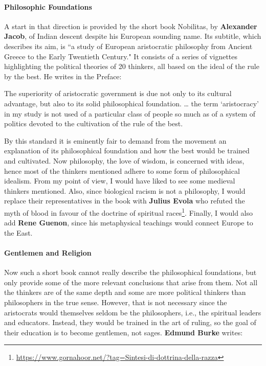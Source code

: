 \paragraph{Philosophic Foundations}
A start in that direction is provided by the short book Nobilitas, by \textbf{Alexander Jacob}, of Indian descent despite his European sounding name. Its subtitle, which describes its aim, is ``a study of European aristocratic philosophy from Ancient Greece to the Early Twentieth Century." It consists of a series of vignettes highlighting the political theories of 20 thinkers, all based on the ideal of the rule by the best. He writes in the Preface:

\begin{quotex}
The superiority of aristocratic government is due not only to its cultural advantage, but also to its solid philosophical foundation. … the term `aristocracy' in my study is not used of a particular class of people so much as of a system of politics devoted to the cultivation of the rule of the best. 

\end{quotex}
By this standard it is eminently fair to demand from the movement an explanation of its philosophical foundation and how the best would be trained and cultivated. Now philosophy, the love of wisdom, is concerned with ideas, hence most of the thinkers mentioned adhere to some form of philosophical idealism. From my point of view, I would have liked to see some medieval thinkers mentioned. Also, since biological racism is not a philosophy, I would replace their representatives in the book with \textbf{Julius Evola} who refuted the myth of blood in favour of the doctrine of spiritual races\footnote{\url{https://www.gornahoor.net/?tag=Sintesi-di-dottrina-della-razza}}. Finally, I would also add \textbf{Rene Guenon}, since his metaphysical teachings would connect Europe to the East.

\paragraph{Gentlemen and Religion}
Now such a short book cannot really describe the philosophical foundations, but only provide some of the more relevant conclusions that arise from them. Not all the thinkers are of the same depth and some are more political thinkers than philosophers in the true sense. However, that is not necessary since the aristocrats would themselves seldom be the philosophers, i.e., the spiritual leaders and educators. Instead, they would be trained in the art of ruling, so the goal of their education is to become gentlemen, not sages. \textbf{Edmund Burke} writes:

